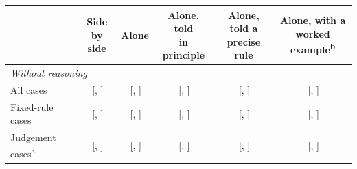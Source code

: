 \begin{table}[t]
\centering
\small
\begin{tabular}{lccccc}
\toprule
 & \shortstack{Side\\by side} & Alone & \shortstack{Alone, told\\in principle} & \shortstack{Alone, told a\\precise rule} & \shortstack{Alone, with a\\worked example\textsuperscript{b}} \\
\midrule
\multicolumn{6}{l}{\textit{Without reasoning}} \\
All cases & \SideBySideNoReasoning{}\,{\scriptsize[\SideBySideNoReasoningLo{}, \SideBySideNoReasoningHi{}]} & \AloneNoReasoning{}\,{\scriptsize[\AloneNoReasoningLo{}, \AloneNoReasoningHi{}]} & \ToldPrincipleNoReasoning{}\,{\scriptsize[\ToldPrincipleNoReasoningLo{}, \ToldPrincipleNoReasoningHi{}]} & \ToldRuleNoReasoning{}\,{\scriptsize[\ToldRuleNoReasoningLo{}, \ToldRuleNoReasoningHi{}]} & \ExampleSplitNoReasoning{}\,{\scriptsize[\ExampleSplitNoReasoningLo{}, \ExampleSplitNoReasoningHi{}]} \\
Fixed-rule cases & \SideBySideNoReasoningFixedRule{}\,{\scriptsize[\SideBySideNoReasoningFixedRuleLo{}, \SideBySideNoReasoningFixedRuleHi{}]} & \AloneNoReasoningFixedRule{}\,{\scriptsize[\AloneNoReasoningFixedRuleLo{}, \AloneNoReasoningFixedRuleHi{}]} & \ToldPrincipleNoReasoningFixedRule{}\,{\scriptsize[\ToldPrincipleNoReasoningFixedRuleLo{}, \ToldPrincipleNoReasoningFixedRuleHi{}]} & \ToldRuleNoReasoningFixedRule{}\,{\scriptsize[\ToldRuleNoReasoningFixedRuleLo{}, \ToldRuleNoReasoningFixedRuleHi{}]} & \ExampleSplitNoReasoningFixedRule{}\,{\scriptsize[\ExampleSplitNoReasoningFixedRuleLo{}, \ExampleSplitNoReasoningFixedRuleHi{}]} \\
Judgement cases\textsuperscript{a} & \SideBySideNoReasoningJudgement{}\,{\scriptsize[\SideBySideNoReasoningJudgementLo{}, \SideBySideNoReasoningJudgementHi{}]} & \AloneNoReasoningJudgement{}\,{\scriptsize[\AloneNoReasoningJudgementLo{}, \AloneNoReasoningJudgementHi{}]} & \ToldPrincipleNoReasoningJudgement{}\,{\scriptsize[\ToldPrincipleNoReasoningJudgementLo{}, \ToldPrincipleNoReasoningJudgementHi{}]} & \ToldRuleNoReasoningJudgement{}\,{\scriptsize[\ToldRuleNoReasoningJudgementLo{}, \ToldRuleNoReasoningJudgementHi{}]} & \ExampleSplitNoReasoningJudgement{}\,{\scriptsize[\ExampleSplitNoReasoningJudgementLo{}, \ExampleSplitNoReasoningJudgementHi{}]} \\

\end{tabular}
\end{table}
